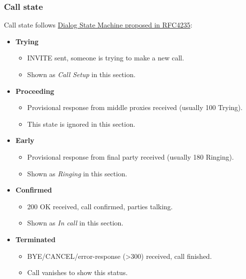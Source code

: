 \documentclass[letterpaper,10pt,english]{sphinxmanual}
\begin{document}
\subsubsection{Call state}
\label{administration_portal/brand/calls/active_calls:call-state}
Call state follows \href{https://tools.ietf.org/html/rfc4235\#section-3.7.1}{Dialog State Machine proposed in RFC4235}:
\begin{itemize}
\item {} 
\textbf{Trying}
\begin{itemize}
\item {} 
INVITE sent, someone is trying to make a new call.

\item {} 
Shown as \emph{Call Setup} in this section.

\end{itemize}

\item {} 
\textbf{Proceeding}
\begin{itemize}
\item {} 
Provisional response from middle proxies received (usually 100 Trying).

\item {} 
This state is ignored in this section.

\end{itemize}

\item {} 
\textbf{Early}
\begin{itemize}
\item {} 
Provisional response from final party received (usually 180 Ringing).

\item {} 
Shown as \emph{Ringing} in this section.

\end{itemize}

\item {} 
\textbf{Confirmed}
\begin{itemize}
\item {} 
200 OK received, call confirmed, parties talking.

\item {} 
Shown as \emph{In call} in this section.

\end{itemize}

\item {} 
\textbf{Terminated}
\begin{itemize}
\item {} 
BYE/CANCEL/error-response (\textgreater{}300) received, call finished.

\item {} 
Call vanishes to show this status.

\end{itemize}

\end{itemize}
\end{document}
